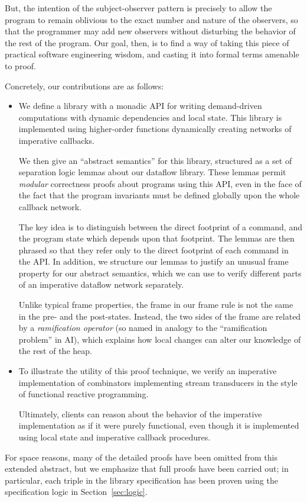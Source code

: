 \documentclass[preprint,natbib]{sigplanconf}
\begin{document}
But, the intention of the subject-observer pattern is
precisely to allow the program to remain oblivious to the exact number
and nature of the observers, so that the programmer may add new
observers without disturbing the behavior of the rest of the program.
Our goal, then, is to find a way of taking this piece of practical
software engineering wisdom, and casting it into formal terms amenable
to proof.

Concretely, our contributions are as follows: 

\begin{itemize}
  \item We define a library with a monadic API for writing
    demand-driven computations with dynamic dependencies and local
    state. This library is implemented using higher-order functions
    dynamically creating networks of imperative callbacks.

    We then give an ``abstract semantics'' for this
    library, structured as a set of separation logic lemmas about our
    dataflow library. These lemmas permit \emph{modular} correctness
    proofs about programs using this API, even in the face of the fact
    that the program invariants must be defined globally upon the
    whole callback network.

    The key idea is to distinguish between the direct footprint of a
    command, and the program state which depends upon that
    footprint. The lemmas are then phrased so that they refer only to
    the direct footprint of each command in the API. In addition, we
    structure our lemmas to justify an unusual frame property for our
    abstract semantics, which we can use to verify different parts of
    an imperative dataflow network separately.

    Unlike typical frame properties, the frame in our frame rule is
    not the same in the pre- and the post-states. Instead, the two
    sides of the frame are related by a \emph{ramification operator}
    (so named in analogy to the ``ramification problem'' in AI), which
    explains how local changes can alter our knowledge of the rest of
    the heap.

  \item To illustrate the utility of this proof technique, we verify
    an imperative implementation of combinators implementing stream
    transducers in the style of functional reactive programming. 

    Ultimately, clients can reason about the behavior of the imperative
    implementation as if it were purely functional, even though it
    is implemented using local state and imperative callback
    procedures.
\end{itemize}
%
For space reasons, many of the detailed proofs have been omitted from
this extended abstract, but we emphasize that full proofs have been
carried out; in particular, each triple in the library specification
has been proven using the specification logic in
Section~\ref{sec:logic}.
\end{document}
